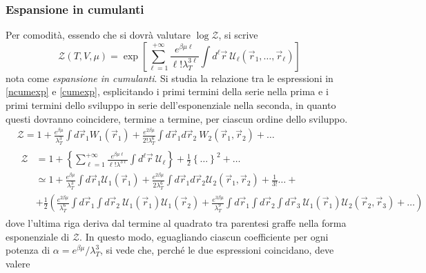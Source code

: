 \documentclass[11pt, a4paper]{scrartcl}
\theoremstyle{style}
\theoremstyle{style1}
\numberwithin{equation}{subsection}
\begin{document}
\subsubsection{Espansione in cumulanti}
Per comodit\`a, essendo che si dovr\`a valutare $\log \mathcal{Z} $, si scrive 
\begin{equation}\label{cumexp}
\mathcal{Z} (T,V,\mu ) = \exp \left[ \sum_{\ell =1}^{+\infty} \frac{e^{\beta \mu \ell }}{\ell ! \lambda _T^{3\ell } } \int d^\ell \vec{r} \ \mathcal{U}_\ell (\vec{r}_1,\ldots,\vec{r}_\ell ) \right] 
\end{equation}
nota come \textit{espansione in cumulanti}.
Si studia la relazione tra le espressioni in \ref{ncumexp} e \ref{cumexp}, esplicitando i primi termini della serie nella prima e i primi termini dello sviluppo in serie dell'esponenziale nella seconda, in quanto questi dovranno coincidere, termine a termine, per ciascun ordine dello sviluppo.
\[
\begin{split}
	& \mathcal{Z}  = 1 + \frac{e^{\beta \mu }}{\lambda _T^3}  \int d\vec{r}_1 W_1 (\vec{r}_1) + \frac{e^{2 \beta \mu }}{2! \lambda _T^6} \int d\vec{r}_1 d\vec{r}_2 \ W_2 (\vec{r}_1, \vec{r}_2)+\ldots \\
	&\begin{split}
		\mathcal{Z}  &= 1 + \left\{ \sum_{\ell =1}^{+\infty} \frac{e^{\beta \mu \ell }}{\ell ! \lambda ^{3\ell } } \int d^\ell \vec{r}\ \mathcal{U} _\ell  \right\} + \frac{1}{2} \left\{ \ldots \right\} ^2 + \ldots\\
			     &\simeq 1 +  \frac{e^{\beta \mu }}{\lambda _T^3} \int d\vec{r}_1 \mathcal{U} _1(\vec{r}_1) + \frac{e^{2\beta \mu }}{2\lambda _T^6} \int d\vec{r}_1 d\vec{r}_2 \mathcal{U} _2 (\vec{r}_1,\vec{r}_2) + \frac{1}{3!}\ldots + \\
			     &+ \frac{1}{2}\left(\frac{e^{2\beta \mu }}{\lambda _T^6} \int d\vec{r}_1 \int d\vec{r}_2 \ \mathcal{U} _1(\vec{r}_1) \mathcal{U} _1 (\vec{r}_2) +  \frac{e^{3\beta \mu }}{\lambda _T^9} \int d\vec{r}_1 \int d\vec{r}_2 \int d\vec{r}_3\ \mathcal{U} _1(\vec{r}_1) \mathcal{U} _2(\vec{r}_2, \vec{r}_3) +\ldots
\right) 	
	\end{split}
\end{split}
\] 
dove l'ultima riga deriva dal termine al quadrato tra parentesi graffe nella forma esponenziale di $\mathcal{Z} $.
In questo modo, eguagliando ciascun coefficiente per ogni potenza di $\alpha  = e^{\beta \mu }/\lambda _T^3$, si vede che, perch\'e le due espressioni coincidano, deve valere
\end{document}
